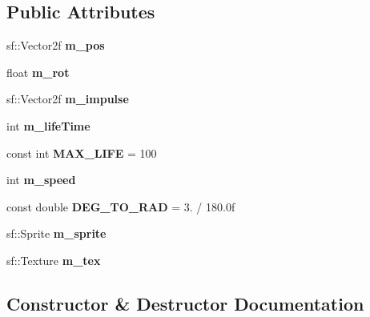 \subsection*{Public Attributes}
\begin{DoxyCompactItemize}
\item 
\mbox{\label{class_bullet_ae4fd7b85677ea372cab42e70e41cc912}} 
sf\+::\+Vector2f {\bfseries m\+\_\+pos}
\item 
\mbox{\label{class_bullet_a05b65db0dc996f5072c789dc396cf710}} 
float {\bfseries m\+\_\+rot}
\item 
\mbox{\label{class_bullet_a824877f69a05df386f7e00f5e8463ed2}} 
sf\+::\+Vector2f {\bfseries m\+\_\+impulse}
\item 
\mbox{\label{class_bullet_ae7f59d3e8b0e4fd2af67d41eadec94e6}} 
int {\bfseries m\+\_\+life\+Time}
\item 
\mbox{\label{class_bullet_a26f0b80f081fbc17a921aa02f5bfdc22}} 
const int {\bfseries M\+A\+X\+\_\+\+L\+I\+FE} = 100
\item 
\mbox{\label{class_bullet_a035a6a37b437d63c3cfafa3be57961af}} 
int {\bfseries m\+\_\+speed}
\item 
\mbox{\label{class_bullet_adf9b15d20a72586a694e3f9138d25cb7}} 
const double {\bfseries D\+E\+G\+\_\+\+T\+O\+\_\+\+R\+AD} = 3. / 180.\+0f
\item 
\mbox{\label{class_bullet_a9518e851ff433a413b281f4192893ec9}} 
sf\+::\+Sprite {\bfseries m\+\_\+sprite}
\item 
\mbox{\label{class_bullet_a490ccfd4bb2c1a543a3b6ac8b1a70a41}} 
sf\+::\+Texture {\bfseries m\+\_\+tex}
\end{DoxyCompactItemize}


\subsection{Constructor \& Destructor Documentation}
\mbox{\label{class_bullet_ad019c3e21e52268d22a511a8b37bf09f}} 

